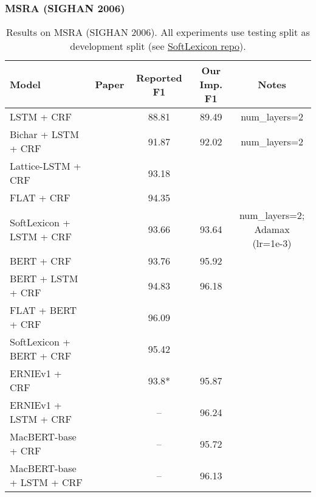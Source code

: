 \documentclass{article}
\begin{document}
\subsubsection{MSRA (SIGHAN 2006)}
\begin{table}[H]
    \centering
    \begin{tabular}{lcccc}
    \toprule
    Model & Paper & Reported F1 & Our Imp. F1 & Notes \\
    \midrule
    LSTM + CRF                  & \citet{zhang2018chinese} & 88.81 & 89.49 & num\_layers=2 \\
    Bichar + LSTM + CRF         & \citet{zhang2018chinese} & 91.87 & 92.02 & num\_layers=2 \\
    Lattice-LSTM + CRF          & \citet{zhang2018chinese} & 93.18 \\
    FLAT + CRF                  & \citet{li2020flat}       & 94.35 \\
    SoftLexicon + LSTM + CRF    & \citet{ma2020simplify}   & 93.66 & 93.64 & \makecell{num\_layers=2; \\Adamax (lr=1e-3)} \\
    \midrule
    BERT + CRF                  & \citet{ma2020simplify}   & 93.76 & 95.92 \\
    BERT + LSTM + CRF           & \citet{ma2020simplify}   & 94.83 & 96.18 \\
    FLAT + BERT + CRF           & \citet{li2020flat}       & 96.09 \\
    SoftLexicon + BERT + CRF    & \citet{ma2020simplify}   & 95.42 \\
    \midrule
    ERNIEv1 + CRF               & \citet{sun2019ernie}     & 93.8* & 95.87 \\
    ERNIEv1 + LSTM + CRF        & \citet{sun2019ernie}     & --    & 96.24 \\
    \midrule
    MacBERT-base + CRF          & \citet{cui2020revisiting} & --    & 95.72 \\
    MacBERT-base + LSTM + CRF   & \citet{cui2020revisiting} & --    & 96.13 \\
    \bottomrule
    \end{tabular}
    \caption{Results on MSRA (SIGHAN 2006). All experiments use testing split as development split (see \href{https://github.com/v-mipeng/LexiconAugmentedNER/issues/3}{SoftLexicon repo}).} 
\end{table}
\end{document}
